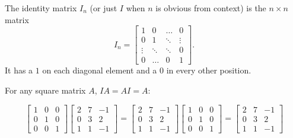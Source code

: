 \begin{definition}
The identity matrix \(I_n\) (or just \(I\) when \(n\) is obvious from context) is  the \(n \times n\) matrix \[I_n = \begin{bmatrix} 1 & 0  & \hdots & 0 \\ 0 & 1 & \ddots & \vdots  \\ \vdots & \ddots & \ddots & 0 \\ 0 & \hdots & 0 & 1 \end{bmatrix}.\]
It has a \(1\) on each diagonal element and a \(0\) in every other position.
\end{definition}

\begin{fact}
  For any square matrix \(A\), \(IA=AI=A\):

  \[
    \begin{bmatrix} 1 & 0 & 0 \\ 0 & 1 & 0 \\ 0 & 0 & 1 \end{bmatrix}
    \begin{bmatrix} 2 & 7 & -1 \\ 0 & 3 & 2 \\ 1 & 1 & -1 \end{bmatrix}
  =
    \begin{bmatrix} 2 & 7 & -1 \\ 0 & 3 & 2 \\ 1 & 1 & -1 \end{bmatrix}
      \begin{bmatrix} 1 & 0 & 0 \\ 0 & 1 & 0 \\ 0 & 0 & 1 \end{bmatrix}
  =
    \begin{bmatrix} 2 & 7 & -1 \\ 0 & 3 & 2 \\ 1 & 1 & -1 \end{bmatrix}
  \]
\end{fact}

